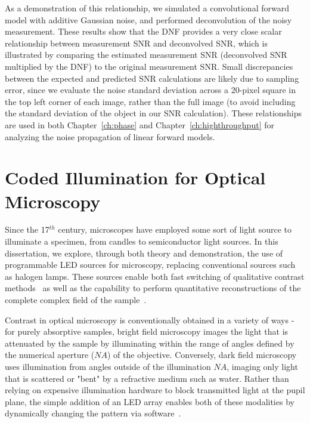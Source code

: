 As a demonstration of this relationship, we simulated a convolutional forward model with additive Gaussian noise, and performed deconvolution of the noisy measurement. These results show that the DNF provides a very close scalar relationship between measurement SNR and deconvolved SNR, which is illustrated by comparing the estimated measurement SNR (deconvolved SNR multiplied by the DNF) to the original measurement SNR. Small discrepancies between the expected and predicted SNR calculations are likely due to sampling error, since we evaluate the noise standard deviation across a 20-pixel square in the top left corner of each image, rather than the full image (to avoid including the standard deviation of the object in our SNR calculation). These relationships are used in both Chapter~\ref{ch:phase} and Chapter~\ref{ch:highthroughput} for analyzing the noise propagation of linear forward models.

\section{Coded Illumination for Optical Microscopy}


Since the 17$^{th}$ century, microscopes have employed some sort of light source to illuminate a specimen, from candles to semiconductor light sources. In this dissertation, we explore, through both theory and demonstration, the use of programmable LED sources for microscopy, replacing conventional sources such as halogen lamps. These sources enable both fast switching of qualitative contrast methods~\cite{Zheng2011, albeanu2008led} as well as the capability to perform quantitative reconstructions of the complete complex field of the sample~\cite{Tian3dDpc, Zheng2013, tian2015quantitative}.

Contrast in optical microscopy is conventionally obtained in a variety of ways - for purely absorptive samples, bright field microscopy images the light that is attenuated by the sample by illuminating within the range of angles defined by the numerical aperture ($NA$) of the objective. Conversely, dark field microscopy uses illumination from angles outside of the illumination $NA$, imaging only light that is scattered or "bent" by a refractive medium such as water. Rather than relying on expensive illumination hardware to block transmitted light at the pupil plane, the simple addition of an LED array enables both of these modalities by dynamically changing the pattern via software~\cite{Zheng2011, zijiMulti}.

